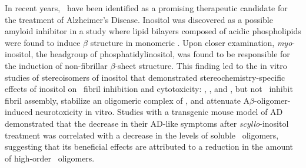 In recent years, \scylloi\ have been identified as a promising therapeutic candidate for the treatment of Alzheimer's Disease. Inositol was discovered as a possible amyloid inhibitor in a study where lipid bilayers composed of acidic phospholipids were found to induce $\beta$ structure in monomeric .\cite{McLaurin:1996p584} Upon closer examination, \emph{myo}-inositol, the headgroup of phosphatidylinositol, was found to be responsible for the induction of non-fibrillar $\beta$-sheet structure.\cite{McLaurin:1998p3976, McLaurin:1998p3149} This finding led to the in vitro studies of stereoisomers of inositol that demonstrated stereochemistry-specific effects of inositol on \abeta\ fibril inhibition and cytotoxicity: \scyllo, \myo, and \epi, but not \chiroi\ inhibit  fibril assembly, stabilize an oligomeric complex of , and attenuate A$\beta$-oligomer-induced neurotoxicity in vitro.\cite{McLaurin:2000bq} Studies with a transgenic mouse model of AD demonstrated that the decrease in their AD-like symptoms after \emph{scyllo}-inositol treatment was correlated with a decrease in the levels of soluble \abeta\ oligomers, suggesting that its beneficial effects are attributed to a reduction in the amount of high-order \abeta\ oligomers.\cite{McLaurin:2006eb}


